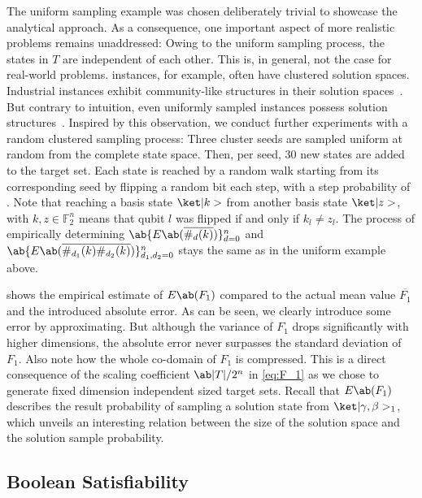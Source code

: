 The uniform sampling example was chosen deliberately trivial to showcase the analytical approach. As a consequence, one important aspect of more realistic problems remains unaddressed: Owing to the uniform sampling process, the states in $T$ are independent of each other. This is, in general, not the case for real-world problems. \SAT instances, for example, often have clustered solution spaces. Industrial \SAT instances exhibit community-like structures in their solution spaces~\cite{AnsoteguiGL12}. But contrary to intuition, even uniformly sampled \SAT instances possess solution structures~\cite{PariLYQ04}. Inspired by this observation, we conduct further experiments with a random clustered sampling process: Three cluster seeds are sampled uniform at random from the complete state space. Then, per seed, 30 new states are added to the target set. Each state is reached by a random walk starting from its corresponding seed by flipping a random bit each step, with a step probability of . Note that reaching a basis state $\ket|k>$ from another basis state $\ket|z>$, with $k, z \in \mathds{F}_2^n$ means that qubit $l$ was flipped if and only if $k_l \neq z_l$. The process of empirically determining $\ab\{E\ab(\overline{\#_d (k)})\}_{d=0}^n$ and $\ab\{E\ab(\overline{\#_{d_1} (k) \#_{d_2} (k)})\}_{d_1, d_2 = 0}^n$ stays the same as in the uniform example above.

 shows the empirical estimate of $E\ab(F_1)$ compared to the actual mean value $\overline{F_1}$ and the introduced absolute error. As can be seen, we clearly introduce some error by approximating. But although the variance of $F_1$ drops significantly with higher dimensions, the absolute error never surpasses the standard deviation of $F_1$. Also note how the whole co-domain of $F_1$ is compressed. This is a direct consequence of the scaling coefficient \(\ab|T|/2^n\) in \cref{eq:F_1} as we chose to generate fixed dimension independent sized target sets. Recall that $E\ab(F_1)$ describes the result probability of sampling a solution state from $\ket|\pangle, \mangle>_1$, which unveils an interesting relation between the size of the solution space and the solution sample probability.  


\subsection{Boolean Satisfiability}

